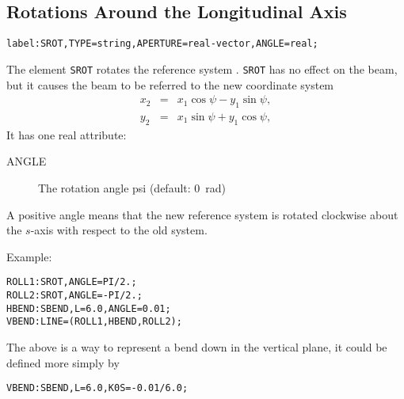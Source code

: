 \subsection{Rotations Around the Longitudinal Axis}
\label{sec:srot}
\begin{verbatim}
label:SROT,TYPE=string,APERTURE=real-vector,ANGLE=real;
\end{verbatim}
The element \texttt{SROT} rotates the reference system
.
\texttt{SROT} has no effect on the beam,
but it causes the beam to be referred to the new coordinate system
\[\begin{array}{lcl}
  x_2&=&x_1\cos\psi-y_1\sin\psi, \\
  y_2&=&x_1\sin\psi+y_1\cos\psi,
\end{array}\]
It has one real attribute:
\begin{description}
\item[ANGLE]
  The rotation angle psi (default: 0~rad)
\end{description}
A positive angle means that the new reference system is rotated clockwise
about the $s$-axis with respect to the old system.

\noindent Example:
\begin{verbatim}
ROLL1:SROT,ANGLE=PI/2.;
ROLL2:SROT,ANGLE=-PI/2.;
HBEND:SBEND,L=6.0,ANGLE=0.01;
VBEND:LINE=(ROLL1,HBEND,ROLL2);
\end{verbatim}
The above is a way to represent a bend down in the vertical plane,
it could be defined more simply by
\begin{verbatim}
VBEND:SBEND,L=6.0,K0S=-0.01/6.0;
\end{verbatim}

